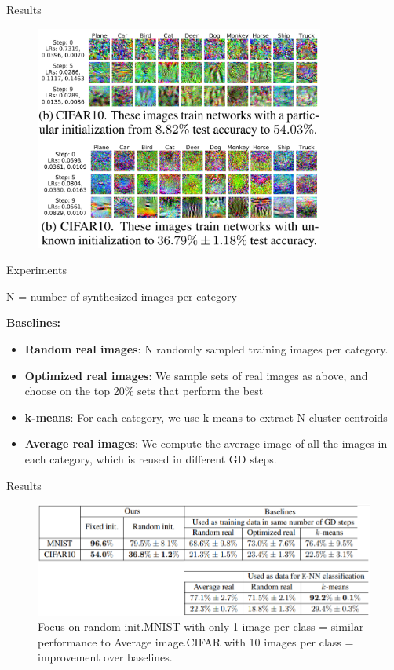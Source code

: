 \documentclass{beamer}
\begin{document}
\begin{frame}{Results}
\begin{figure}[h]
\includegraphics[width=0.85\textwidth]{img/results2}
\end{figure}
\end{frame}
\begin{frame}{Experiments}

N = number of synthesized images per category

\textbf{Baselines:}
\begin{itemize}
\item \textbf{Random real images}: N randomly sampled training images per
category.
\item \textbf{Optimized real images}: We sample sets of real images as above, and choose on the top 20\%
sets that perform the best
\item \textbf{k-means}: For each category, we use k-means to extract N cluster centroids
\item \textbf{Average real images}: We compute the average image of all the images in each category, which
is reused in different GD steps.
\end{itemize}

\end{frame}
\begin{frame}{Results}
\begin{figure}[h]
\includegraphics[width=1.\textwidth]{img/results3}
\caption{Focus on random init.\linebreak MNIST with only 1 image per class = similar performance to Average image.\linebreak CIFAR with 10 images per class = improvement over baselines.}
\end{figure}
\end{frame}
\end{document}
